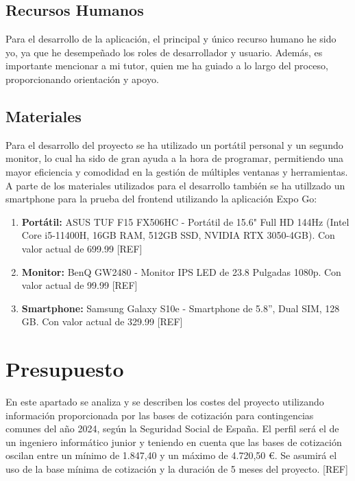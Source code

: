 \subsection{Recursos Humanos}

Para el desarrollo de la aplicación, el principal y único recurso humano he sido yo, ya que he desempeñado los roles de desarrollador y usuario. Además, es importante mencionar a mi tutor, quien me ha guiado a lo largo del proceso, proporcionando orientación y apoyo.

\subsection{Materiales}

Para el desarrollo del proyecto se ha utilizado un portátil personal y un segundo monitor, lo cual ha sido de gran ayuda a la hora de programar, permitiendo una mayor eficiencia y comodidad en la gestión de múltiples ventanas y herramientas. A parte de los materiales utilizados para el desarrollo también se ha utillzado un smartphone para la prueba del frontend utilizando la aplicación Expo Go:

\begin{enumerate}
    \item \textbf{Portátil:} ASUS TUF F15 FX506HC - Portátil de 15.6" Full HD 144Hz (Intel Core i5-11400H, 16GB RAM, 512GB SSD, NVIDIA RTX 3050-4GB). Con valor actual de 699.99 \EUR{} [REF]

    \item \textbf{Monitor:} BenQ GW2480 - Monitor IPS LED de 23.8 Pulgadas 1080p. Con valor actual de 99.99 \EUR{} [REF]

    \item \textbf{Smartphone:} Samsung Galaxy S10e - Smartphone de 5.8”, Dual SIM, 128 GB. Con valor actual de 329.99 \EUR{} [REF]
\end{enumerate}

\section{Presupuesto}

En este apartado se analiza y se describen los costes del proyecto utilizando información proporcionada por las bases de cotización para contingencias comunes del año 2024, según la Seguridad Social de España. El perfil será el de un ingeniero informático junior y teniendo en cuenta que las bases de cotización oscilan entre un mínimo de 1.847,40 \EUR{} y un máximo de 4.720,50 €. Se asumirá el uso de la base mínima de cotización y la duración de 5 meses del proyecto. [REF]

